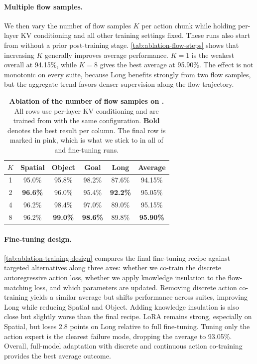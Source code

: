 \paragraph{Multiple flow samples.}
We then vary the number of flow samples \(K\) per action chunk while holding
per-layer KV conditioning and all other training settings fixed.
These runs also start from \molmoacttpre without a prior post-training stage.
\autoref{tab:ablation-flow-steps} shows that increasing \(K\) generally
improves average performance. \(K=1\) is the weakest overall at 94.15\%,
while \(K=8\) gives the best average at 95.90\%.
The effect is not monotonic on every suite, because Long benefits strongly from
two flow samples, but the aggregate trend favors denser supervision along the flow
trajectory.

\begin{table}[h]
\centering
\caption{\textbf{Ablation of the number of flow samples on \libero.} All rows
use per-layer KV conditioning and are trained from \molmoacttpre with the same
configuration. \textbf{Bold} denotes the best result per column. The final row is marked in pink, which is what we stick to in all of \molmoactt and \molmothink fine-tuning runs.}
\begin{tabular}{cccccc}
\textbf{\(K\)} & \textbf{Spatial} & \textbf{Object} & \textbf{Goal} & \textbf{Long} & \textbf{Average} \\
\midrule
1 & 95.0\% & 95.8\% & 98.2\% & 87.6\% & 94.15\% \\
2 & \textbf{96.6\%} & 96.0\% & 95.4\% & \textbf{92.2\%} & 95.05\% \\
4 & 96.2\% & 98.4\% & 97.0\% & 89.0\% & 95.15\% \\
\color{ai2pink}8 & 96.2\% & \textbf{99.0\%} & \textbf{98.6\%} & 89.8\% & \textbf{95.90\%} \\
\end{tabular}
\label{tab:ablation-flow-steps}
\end{table}

\paragraph{Fine-tuning design.}
\autoref{tab:ablation-training-design} compares the final \molmoactt fine-tuning recipe
against targeted alternatives along three axes: whether we co-train the
discrete autoregressive action loss, whether we apply knowledge insulation to
the flow-matching loss, and which parameters are updated. Removing discrete
action co-training yields a similar average but shifts performance across
suites, improving Long while reducing Spatial and Object. Adding knowledge
insulation is also close but slightly worse than the final recipe. LoRA remains
strong, especially on Spatial, but loses 2.8 points on Long relative to full
fine-tuning. Tuning only the action expert is the clearest failure mode,
dropping the average to 93.05\%. Overall, full-model adaptation with discrete
and continuous action co-training provides the best average outcome.

